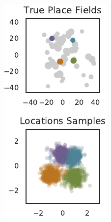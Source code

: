 \begin{figure}[t!]
\begin{center}
\begin{subfigure}[T]{1.4in}
      \label{fig:hipp_locations_0}
    \end{subfigure}
    \begin{subfigure}[T]{1.4in}
      \caption{}
      \vspace{-1em}
      \includegraphics[width=\textwidth]{figures/ch3/locations_7} 

\end{subfigure}
\end{center}
\end{figure}
